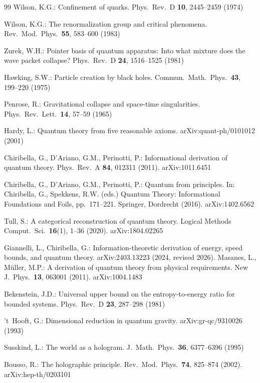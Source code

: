 \documentclass[11pt]{article}
\theoremstyle{remark}
\begin{document}
\begin{thebibliography}{99}
 Wilson, K.G.: Confinement of quarks. Phys.\ Rev.\ D \textbf{10}, 2445--2459 (1974)

 Wilson, K.G.: The renormalization group and critical phenomena. Rev.\ Mod.\ Phys.\ \textbf{55}, 583--600 (1983)

 Zurek, W.H.: Pointer basis of quantum apparatus: Into what mixture does the wave packet collapse? Phys.\ Rev.\ D \textbf{24}, 1516--1525 (1981)

 Hawking, S.W.: Particle creation by black holes. Commun.\ Math.\ Phys.\ \textbf{43}, 199--220 (1975)

 Penrose, R.: Gravitational collapse and space-time singularities. Phys.\ Rev.\ Lett.\ \textbf{14}, 57--59 (1965)

 Hardy, L.: Quantum theory from five reasonable axioms. arXiv:quant-ph/0101012 (2001)

 Chiribella, G., D'Ariano, G.M., Perinotti, P.: Informational derivation of quantum theory. Phys.\ Rev.\ A \textbf{84}, 012311 (2011). arXiv:1011.6451

 Chiribella, G., D'Ariano, G.M., Perinotti, P.: Quantum from principles. In: Chiribella, G., Spekkens, R.W. (eds.) Quantum Theory: Informational Foundations and Foils, pp.\ 171--221. Springer, Dordrecht (2016). arXiv:1402.6562

 Tull, S.: A categorical reconstruction of quantum theory. Logical Methods Comput.\ Sci.\ \textbf{16}(1), 1--36 (2020). arXiv:1804.02265

 Giannelli, L., Chiribella, G.: Information-theoretic derivation of energy, speed bounds, and quantum theory. arXiv:2403.13223 (2024, revised 2026).
 Masanes, L., M\"uller, M.P.: A derivation of quantum theory from physical requirements. New J.\ Phys.\ \textbf{13}, 063001 (2011). arXiv:1004.1483

 Bekenstein, J.D.: Universal upper bound on the entropy-to-energy ratio for bounded systems. Phys.\ Rev.\ D \textbf{23}, 287--298 (1981)

 't~Hooft, G.: Dimensional reduction in quantum gravity. arXiv:gr-qc/9310026 (1993)

 Susskind, L.: The world as a hologram. J.\ Math.\ Phys.\ \textbf{36}, 6377--6396 (1995)

 Bousso, R.: The holographic principle. Rev.\ Mod.\ Phys.\ \textbf{74}, 825--874 (2002). arXiv:hep-th/0203101


\end{thebibliography}
\end{document}
